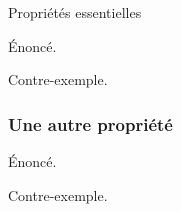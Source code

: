 \documentclass{beamer}
\begin{document}
\begin{frame}{Propriétés essentielles}
  \begin{proposition}Énoncé.\end{proposition}
  \begin{example*}Contre-exemple.\end{example*}
\end{frame}
\begin{frame}
  \frametitle{Une autre propriété}
  \begin{proposition}Énoncé.\end{proposition}
  \begin{example*}Contre-exemple.\end{example*}
\end{frame}
\end{document}
